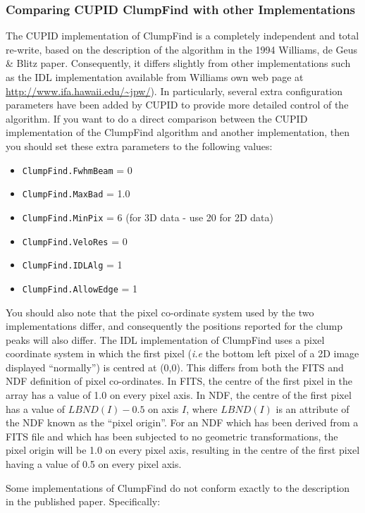 \documentclass[twoside,11pt]{starlink}
\begin{document}
\subsubsection{Comparing CUPID ClumpFind with other Implementations}
The CUPID implementation of ClumpFind is a completely independent
and total re-write, based on the description of the algorithm in the 1994
Williams, de Geus \& Blitz paper. Consequently, it differs slightly from
other implementations such as the IDL implementation available from
Williams own web page at \url{http://www.ifa.hawaii.edu/~jpw/}).
In particularly, several extra
configuration parameters have been added by CUPID to provide more
detailed control of the algorithm. If you want to do a direct comparison
between the CUPID implementation of the ClumpFind algorithm and another
implementation, then you should set these extra parameters to the
following values:

\begin{itemize}
\item \texttt{ClumpFind.FwhmBeam} = 0
\item \texttt{ClumpFind.MaxBad} = 1.0
\item \texttt{ClumpFind.MinPix} = 6 (for 3D data - use 20 for 2D data)
\item \texttt{ClumpFind.VeloRes} = 0
\item \texttt{ClumpFind.IDLAlg} = 1
\item \texttt{ClumpFind.AllowEdge} = 1
\end{itemize}

You should also note that the pixel co-ordinate system used by the two
implementations differ, and consequently the positions reported for the
clump peaks will also differ. The IDL implementation of ClumpFind uses a
pixel coordinate system in which the first pixel (\emph{i.e} the bottom
left pixel of a 2D image displayed ``normally'') is centred at (0,0).
This differs from both the FITS and NDF definition of pixel co-ordinates.
In FITS, the centre of the first pixel in the array has a value of 1.0 on
every pixel axis. In NDF, the centre of the first pixel has a value of
$LBND(I) - 0.5$ on axis $I$, where $LBND(I)$ is an attribute of the NDF
known as the ``pixel origin''. For an NDF which has been derived from a
FITS file and which has been subjected to no geometric transformations,
the pixel origin will be 1.0 on every pixel axis, resulting in the centre
of the first pixel having a value of 0.5 on every pixel axis.

Some implementations of ClumpFind do not conform exactly to the description
in the published paper. Specifically:
\end{document}
